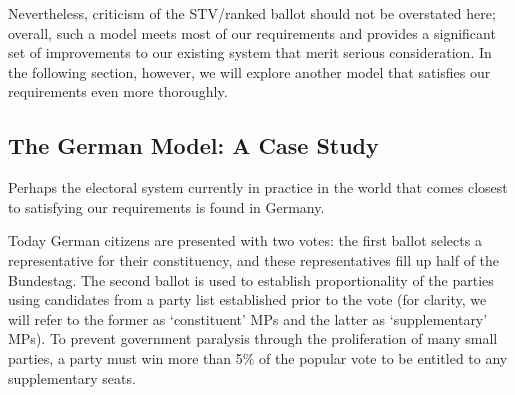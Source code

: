\documentclass[DIV=calc, paper=a4, fontsize=11pt, twocolumn]{scrartcl}	 %
\begin{document}
Nevertheless, criticism of the STV/ranked ballot should not be overstated here; overall, such a model meets most of our requirements and provides a significant set of improvements to our existing system that merit serious consideration. In the following section, however, we will explore another model that satisfies our requirements even more thoroughly.


\subsection{The German Model: A Case Study}
\label{sec:german_model}

Perhaps the electoral system currently in practice in the world that comes closest to satisfying our requirements is found in Germany.

Today German citizens are presented with two votes: the first ballot selects a representative for their constituency, and these representatives fill up half of the Bundestag. The second ballot is used to establish proportionality of the parties using candidates from a party list established prior to the vote
(for clarity, we will refer to the former as `constituent' MPs  and the latter as `supplementary' MPs).
To prevent government paralysis through the proliferation of many small parties, a party must win more than 5\% of the popular vote to be entitled to any supplementary seats.
\end{document}
